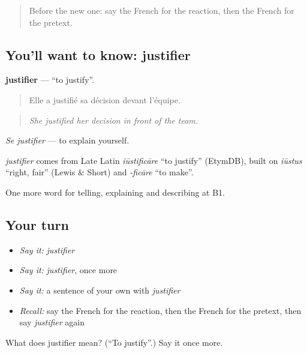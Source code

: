 \begin{quote}
Before the new one: say the French for the reaction, then the French for the pretext.
\end{quote}

\subsection*{You'll want to know: justifier}
\textbf{justifier} — \textquotedblleft{}to justify\textquotedblright{}.

\begin{quote}
Elle a justifié sa décision devant l'équipe.
\end{quote}

\begin{quote}
\emph{She justified her decision in front of the team.}
\end{quote}

\emph{Se justifier} — to explain yourself.

\begin{cousinweb}
\emph{justifier} comes from Late Latin \emph{iūstificāre} \textquotedblleft{}to justify\textquotedblright{} (EtymDB), built on \emph{iūstus} \textquotedblleft{}right, fair\textquotedblright{} (Lewis \& Short) and \emph{-ficāre} \textquotedblleft{}to make\textquotedblright{}.
\end{cousinweb}

\begin{grammarlens}[title={What you've built}]
One more word for telling, explaining and describing at B1.
\end{grammarlens}

\subsection*{Your turn}
\begin{itemize}
\raggedright
  \item \emph{Say it:} \emph{justifier}
  \item \emph{Say it:} \emph{justifier}, once more
  \item \emph{Say it:} a sentence of your own with \emph{justifier}
  \item \emph{Recall:} say the French for the reaction, then the French for the pretext, then say \emph{justifier} again
\end{itemize}

\begin{tcolorbox}[breakable,colback=teal!4,colframe=teal!35!black,title={Before you move on}]
What does justifier mean? (\textquotedblleft{}To justify\textquotedblright{}.) Say it once more.
\end{tcolorbox}

